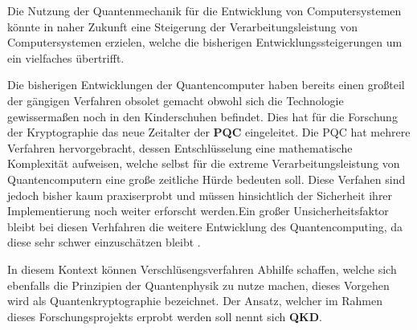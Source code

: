 Die Nutzung der Quantenmechanik für die Entwicklung von Computersystemen könnte in naher Zukunft eine Steigerung der Verarbeitungsleistung von Computersystemen erzielen, welche die bisherigen Entwicklungssteigerungen um ein vielfaches übertrifft.

Die bisherigen Entwicklungen der Quantencomputer haben bereits einen großteil der gängigen Verfahren obsolet gemacht obwohl sich die Technologie gewissermaßen noch in den Kinderschuhen befindet. Dies hat für die Forschung der Kryptographie das neue Zeitalter der \textbf{\ac{PQC}} eingeleitet. Die \ac{PQC} hat mehrere Verfahren hervorgebracht, dessen Entschlüsselung eine mathematische Komplexität aufweisen, welche selbst für die extreme Verarbeitungsleistung von Quantencomputern eine große zeitliche Hürde bedeuten soll. Diese Verfahen sind jedoch bisher kaum praxiserprobt und müssen hinsichtlich der Sicherheit ihrer Implementierung noch weiter erforscht werden.Ein großer Unsicherheitsfaktor bleibt bei diesen Verhfahren die weitere Entwicklung des Quantencomputing, da diese sehr schwer einzuschätzen bleibt \cite{BSI1} \cite{BSI2}.

In diesem Kontext können Verschlüsengsverfahren Abhilfe schaffen, welche sich ebenfalls die Prinzipien der Quantenphysik zu nutze machen, dieses Vorgehen wird als Quantenkryptographie bezeichnet. Der Ansatz, welcher im Rahmen dieses Forschungsprojekts erprobt werden soll nennt sich \textbf{\ac{QKD}}.